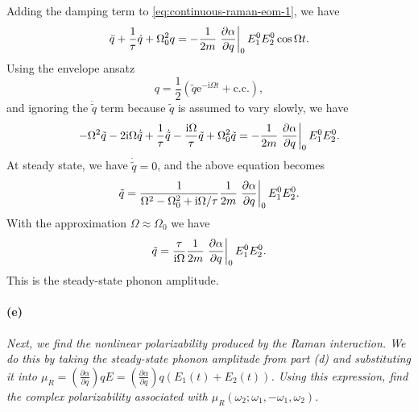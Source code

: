 \documentclass[hyperref, a4paper]{article}
\newcommand*{\ii}{\mathrm{i}}
\newcommand*{\ee}{\mathrm{e}}
\begin{document}
Adding the damping term to \eqref{eq:continuous-raman-eom-1}, we have 
\begin{equation}
    \ddot{q} + \frac{1}{\tau} \dot{q} + \Omega_0^2 q = 
    - \frac{1}{2 m} \eval{\pdv{\alpha}{q}}_0 E_1^0 E_2^0 \cos \Omega t.
\end{equation}
Using the envelope ansatz 
\begin{equation}
    q = \frac{1}{2} (\tilde{q} \ee^{- \ii \Omega t} + \text{c.c.}) ,
\end{equation}
and ignoring the $\ddot{\tilde{q}}$ term because $\tilde{q}$ 
is assumed to vary slowly,
we have 
\begin{equation}
    - \Omega^2 \tilde{q} - 2 \ii \Omega \dot{\tilde{q}} 
    + \frac{1}{\tau} \dot{\tilde{q}} 
    - \frac{\ii \Omega}{\tau} \tilde{q}
    + \Omega_0^2 \tilde{q} 
    = - \frac{1}{2m} \eval{\pdv{\alpha}{q}}_0 E_1^0 E_2^0 .
\end{equation} 
At steady state, we have $\dot{\tilde{q}} = 0$, and the above equation becomes 
\begin{equation}
    \tilde{q} = \frac{1}{
        \Omega^2 - \Omega_0^2 + \ii \Omega / \tau 
    } \frac{1}{2m} \eval{\pdv{\alpha}{q}}_0 E_1^0 E_2^0.
    \label{eq:amplitude-q-1}
\end{equation}
With the approximation $\Omega \approx \Omega_0$ we have 
\begin{equation}
    \tilde{q} = \frac{\tau}{
        \ii \Omega 
    } \frac{1}{2m} \eval{\pdv{\alpha}{q}}_0 E_1^0 E_2^0.
\end{equation}
This is the steady-state phonon amplitude.

\paragraph*{(e)} \textit{
    Next, we find the nonlinear polarizability produced by the Raman interaction. We do this by taking the steady-state phonon amplitude from part (d) and substituting it into $\mu_R=\left(\frac{\partial \alpha}{\partial q}\right) q E=\left(\frac{\partial \alpha}{\partial q}\right) q\left(E_1(t)+E_2(t)\right)$. Using this expression, find the complex polarizability associated with $\mu_R\left(\omega_2 ; \omega_1,-\omega_1, \omega_2\right)$.
}
\end{document}

